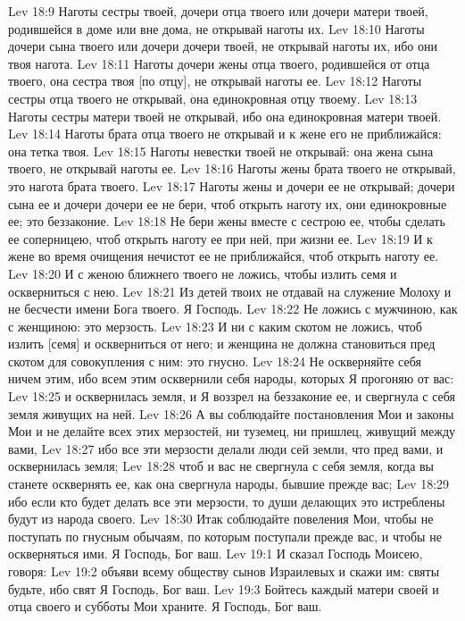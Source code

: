 Lev 18:9  Наготы сестры твоей, дочери отца твоего или дочери матери твоей, родившейся в доме или вне дома, не открывай наготы их.
Lev 18:10  Наготы дочери сына твоего или дочери дочери твоей, не открывай наготы их, ибо они твоя нагота.
Lev 18:11  Наготы дочери жены отца твоего, родившейся от отца твоего, она сестра твоя [по отцу], не открывай наготы ее.
Lev 18:12  Наготы сестры отца твоего не открывай, она единокровная отцу твоему.
Lev 18:13  Наготы сестры матери твоей не открывай, ибо она единокровная матери твоей.
Lev 18:14  Наготы брата отца твоего не открывай и к жене его не приближайся: она тетка твоя.
Lev 18:15  Наготы невестки твоей не открывай: она жена сына твоего, не открывай наготы ее.
Lev 18:16  Наготы жены брата твоего не открывай, это нагота брата твоего.
Lev 18:17  Наготы жены и дочери ее не открывай; дочери сына ее и дочери дочери ее не бери, чтоб открыть наготу их, они единокровные ее; это беззаконие.
Lev 18:18  Не бери жены вместе с сестрою ее, чтобы сделать ее соперницею, чтоб открыть наготу ее при ней, при жизни ее.
Lev 18:19  И к жене во время очищения нечистот ее не приближайся, чтоб открыть наготу ее.
Lev 18:20  И с женою ближнего твоего не ложись, чтобы излить семя и оскверниться с нею.
Lev 18:21  Из детей твоих не отдавай на служение Молоху и не бесчести имени Бога твоего. Я Господь.
Lev 18:22  Не ложись с мужчиною, как с женщиною: это мерзость.
Lev 18:23  И ни с каким скотом не ложись, чтоб излить [семя] и оскверниться от него; и женщина не должна становиться пред скотом для совокупления с ним: это гнусно.
Lev 18:24  Не оскверняйте себя ничем этим, ибо всем этим осквернили себя народы, которых Я прогоняю от вас:
Lev 18:25  и осквернилась земля, и Я воззрел на беззаконие ее, и свергнула с себя земля живущих на ней.
Lev 18:26  А вы соблюдайте постановления Мои и законы Мои и не делайте всех этих мерзостей, ни туземец, ни пришлец, живущий между вами,
Lev 18:27  ибо все эти мерзости делали люди сей земли, что пред вами, и осквернилась земля;
Lev 18:28  чтоб и вас не свергнула с себя земля, когда вы станете осквернять ее, как она свергнула народы, бывшие прежде вас;
Lev 18:29  ибо если кто будет делать все эти мерзости, то души делающих это истреблены будут из народа своего.
Lev 18:30  Итак соблюдайте повеления Мои, чтобы не поступать по гнусным обычаям, по которым поступали прежде вас, и чтобы не оскверняться ими. Я Господь, Бог ваш.
Lev 19:1  И сказал Господь Моисею, говоря:
Lev 19:2  объяви всему обществу сынов Израилевых и скажи им: святы будьте, ибо свят Я Господь, Бог ваш.
Lev 19:3  Бойтесь каждый матери своей и отца своего и субботы Мои храните. Я Господь, Бог ваш.

